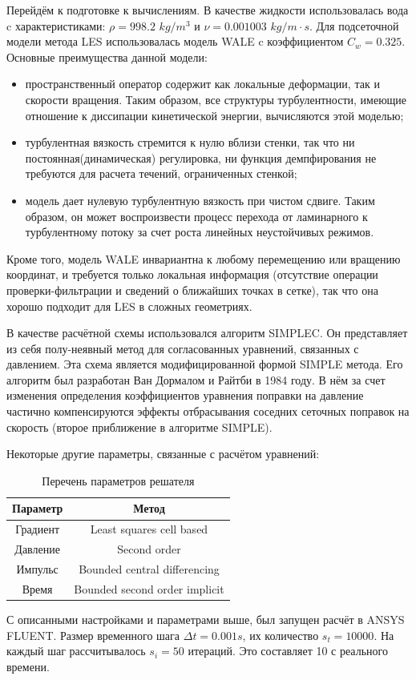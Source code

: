 	Перейдём к подготовке к вычислениям. В качестве жидкости использовалась вода c характеристиками: $\rho = 998.2$ $kg/m^3$ и $\nu = 0.001003$ $kg/m\cdot s$. Для подсеточной модели метода LES использовалась модель WALE c коэффициентом $C_w = 0.325$. Основные преимущества данной модели:
	\begin{itemize}
		\item пространственный оператор содержит как локальные деформации, так и скорости вращения. Таким образом, все структуры турбулентности, имеющие отношение к диссипации кинетической энергии, вычисляются этой моделью;
		\item турбулентная вязкость стремится к нулю вблизи стенки, так что ни постоянная(динамическая) регулировка, ни функция демпфирования не требуются для расчета течений, ограниченных стенкой;
		\item модель дает нулевую турбулентную вязкость при чистом сдвиге. Таким образом, он может воспроизвести процесс перехода от ламинарного к турбулентному потоку за счет роста линейных неустойчивых режимов. 
	\end{itemize}
	Кроме того, модель WALE инвариантна к любому перемещению или вращению координат, и требуется только локальная информация (отсутствие операции проверки-фильтрации и сведений о ближайших точках в сетке), так что она хорошо подходит для LES в сложных геометриях\cite{Nicoud1999}.
	
	В качестве расчётной схемы использовался алгоритм SIMPLEC. Он представляет из себя полу-неявный метод для согласованных уравнений, связанных с давлением. Эта схема является модифицированной формой SIMPLE метода. Его алгоритм был разработан Ван Дормалом и Райтби в 1984 году. В нём за счет изменения определения коэффициентов уравнения поправки на давление частично компенсируются эффекты отбрасывания соседних сеточных поправок на скорость (второе приближение в алгоритме SIMPLE)\cite{Sun2008}.
	
	Некоторые другие параметры, связанные с расчётом уравнений:
	\begin{table}[H]
		\begin{center}
			\begin{tabular}{|c|c|}
				\hline
				Параметр & Метод\\
				\hline
				Градиент & Least squares cell based\\
				\hline
				Давление & Second order\\
				\hline
				Импульс & Bounded central differencing\\
				\hline
				Время & Bounded second order implicit\\
				\hline
			\end{tabular}
		\end{center}
		\caption{Перечень параметров решателя}
	\end{table}
	
	С описанными настройками и параметрами выше, был запущен расчёт в ANSYS FLUENT. Размер временного шага $\Delta t = 0.001 s$, их количество $s_t = 10000$. На каждый шаг рассчитывалось $s_i = 50$ итераций. Это составляет 10 с реального времени.